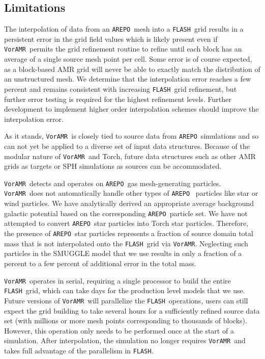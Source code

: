 \documentclass[twoside]{drexel-thesis}
\newcommand\voramr{\texttt{VorAMR}}
\newcommand\flash{\texttt{FLASH}}
\newcommand\arepo{\texttt{AREPO}}
\begin{document}
\begin{thesis}
\subsection{Limitations}
The interpolation of data from an \arepo~mesh into a \flash~grid results in a persistent error in the grid field values which is likely present even if \voramr~permits the grid refinement routine to refine until each block has an average of a single source mesh point per cell.
Some error is of course expected, as a block-based AMR grid will never be able to exactly match the distribution of an unstructured mesh. We determine that the interpolation error reaches a few percent and remains consistent with increasing \flash~grid refinement, but further error testing is required for the highest refinement levels. Further development to implement higher order interpolation schemes should improve the interpolation error.

As it stands, \voramr~is closely tied to source data from \arepo~simulations and so can not yet be applied to a diverse set of input data structures. Because of the modular nature of \voramr~and Torch, future data structures such as other AMR grids as targets or SPH simulations as sources can be accommodated.

\voramr~detects and operates on \arepo~gas mesh-generating particles. \voramr~does not automatically handle other types of \arepo~ particles like star or wind particles. We have analytically derived an appropriate average background galactic potential based on the corresponding \arepo~particle set. We have not attempted to convert \arepo~star particles into Torch star particles. Therefore, the presence of \arepo~star particles represents a fraction of source domain total mass that is not interpolated onto the \flash~grid via \voramr. Neglecting such particles in the SMUGGLE model that we use results in only a fraction of a percent to a few percent of additional error in the total mass. 

\voramr~operates in serial, requiring a single processor to build the entire \flash~grid, which can take days for the production level models that we use. Future versions of \voramr~will parallelize the \flash~operations, users can still expect the grid building to take several hours for a sufficiently refined source data set (with millions or more mesh points corresponding to thousands of blocks). However, this operation only needs to be performed once at the start of a simulation. After interpolation, the simulation no longer requires \voramr~and takes full advantage of the parallelism in \flash.


\end{thesis}
\end{document}
